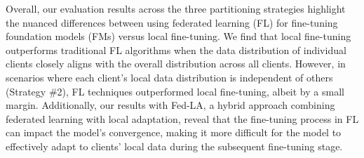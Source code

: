 \begin{table}[htbp]
\caption{Strategy \#3: Comparison of the performance of different FL approaches against zero-shot and local fine-tuning. The table breaks down the performance over ECG and ICG data for 64-point forecast horizons.}
\centering
{}
  \label{tab:strategy_3_summary}
\end{table}



Overall, our evaluation results across the three partitioning strategies highlight the nuanced differences between using federated learning (FL) for fine-tuning foundation models (FMs) versus local fine-tuning. 
We find that local fine-tuning outperforms traditional FL algorithms when the data distribution of individual clients closely aligns with the overall distribution across all clients.
However, in scenarios where each client's local data distribution is independent of others (Strategy \#2), FL techniques outperformed local fine-tuning, albeit by a small margin.
Additionally, our results with Fed-LA, a hybrid approach combining federated learning with local adaptation, reveal that the fine-tuning process in FL can impact the model's convergence, making it more difficult for the model to effectively adapt to clients' local data during the subsequent fine-tuning stage.
